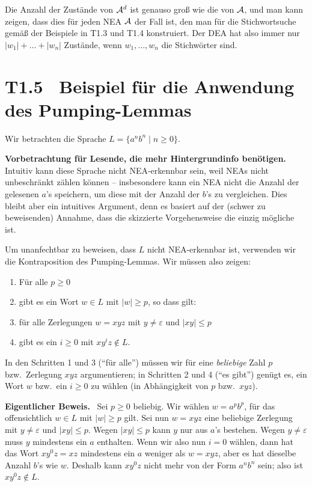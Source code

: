 \documentclass[fontsize=11pt, twoside=false, numbers=autoenddot]{scrbook}
\begin{document}
Die Anzahl der Zustände von $\mathcal{A}^d$ ist genauso groß wie die von $\mathcal{A}$,
und man kann zeigen, dass dies für jeden NEA $\mathcal{A}$ der Fall ist,
den man für die Stichwortsuche gemäß der Beispiele in T1.3 und T1.4 konstruiert.
Der DEA hat also immer nur $|w_1| + \dots + |w_n|$ Zustände,
wenn $w_1,\dots,w_n$ die Stichwörter sind.

\pagebreak
\section*{T1.5~ Beispiel für die Anwendung des Pumping-Lemmas}

Wir betrachten die Sprache $L = \{a^nb^n \mid n \geq 0\}$.

\textsf{\textbf{Vorbetrachtung für Lesende, die mehr Hintergrundinfo benötigen.}}~
Intuitiv kann diese Sprache nicht NEA-erkennbar sein,
weil NEAs nicht unbeschränkt zählen können --
insbesondere kann ein NEA nicht die Anzahl der gelesenen $a$'s
speichern, um diese mit der Anzahl der $b$'s zu vergleichen.
Dies bleibt aber ein intuitives Argument, denn es basiert auf der
(schwer zu beweisenden) Annahme, dass die skizzierte Vorgehensweise
die einzig mögliche ist.

Um unanfechtbar zu beweisen, dass $L$ nicht NEA-erkennbar ist, verwenden wir
die Kontraposition des Pumping-Lemmas. Wir müssen also zeigen:
%
\begin{enumerate}
  \item
    Für alle $p \geq 0$
  \item
    gibt es ein Wort $w \in L$ mit $|w| \geq p$, so dass gilt:
  \item
    für alle Zerlegungen $w=xyz$ mit $y \neq \varepsilon$ und $|xy| \leq p$
  \item
    gibt es ein $i \geq 0$ mit $xy^iz \notin L$.
\end{enumerate}
%
In den Schritten 1 und 3 ("`für alle"') müssen wir
für eine \emph{beliebige} Zahl $p$ bzw.\ Zerlegung $xyz$ argumentieren;
in Schritten 2 und 4 ("`es gibt"') genügt es, ein Wort $w$ bzw.\ ein $i \geq 0$ zu wählen
(in Abhängigkeit von $p$ bzw.\ $xyz$).

\textsf{\textbf{Eigentlicher Beweis.}}~
Sei $p \geq 0$ beliebig. Wir wählen $w=a^pb^p$, für das offensichtlich $w \in L$ mit $|w| \geq p$ gilt.
Sei nun $w=xyz$ eine beliebige Zerlegung mit $y \neq \varepsilon$ und $|xy| \leq p$.
Wegen $|xy| \leq p$ kann $y$ nur aus $a$'s bestehen.
Wegen $y \neq \varepsilon$ muss $y$ mindestens ein $a$ enthalten.
Wenn wir also nun $i=0$ wählen, dann hat das Wort $xy^0z = xz$ mindestens ein $a$ weniger als $w=xyz$,
aber es hat dieselbe Anzahl $b$'s wie $w$. Deshalb kann $xy^0z$ nicht mehr von der Form $a^nb^n$ sein;
also ist $xy^0z \notin L$.
\end{document}
